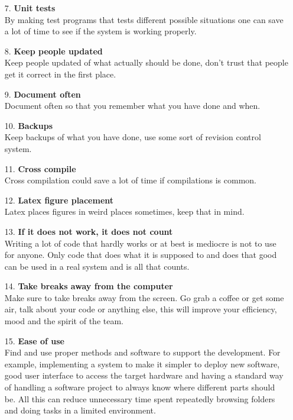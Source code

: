 \documentclass[11pt,a4paper]{amsart}
\begin{document}
\begin{enumerate}
\item[7.]\textbf{Unit tests} \\By making test programs that tests different possible situations one can save a lot of time to see if the system is working properly.

\item[8.]\textbf{Keep people updated} \\Keep people updated of what actually should be done, don't trust that people get it correct in the first place.

\item[9.]\textbf{Document often} \\Document often so that you remember what you have done and when.

\item[10.]\textbf{Backups} \\Keep backups of what you have done, use some sort of revision control system.

\item[11.]\textbf{Cross compile} \\Cross compilation could save a lot of time if compilations is common.

\item[12.]\textbf{Latex figure placement} \\Latex places figures in weird places sometimes, keep that in mind.

\item[13.]\textbf{If it does not work, it does not count} \\Writing a lot of code that hardly works or at best is mediocre is not to use for anyone. Only code that does what it is supposed to and does that good can be used in a real system and is all that counts.

\item[14.]\textbf{Take breaks away from the computer} \\Make sure to take breaks away from the screen. Go grab a coffee or get some air, talk about your code or anything else, this will improve your efficiency, mood and the spirit of the team.

\item[15.]\textbf{Ease of use} \\ Find and use proper methods and software to support the development. For example, implementing a system to make it simpler to deploy new software, good user interface to access the target hardware and having a standard way of handling a software project to always know where different parts should be. All this can reduce unnecessary time spent repeatedly browsing folders and doing tasks in a limited environment. 


\end{enumerate}
\end{document}
